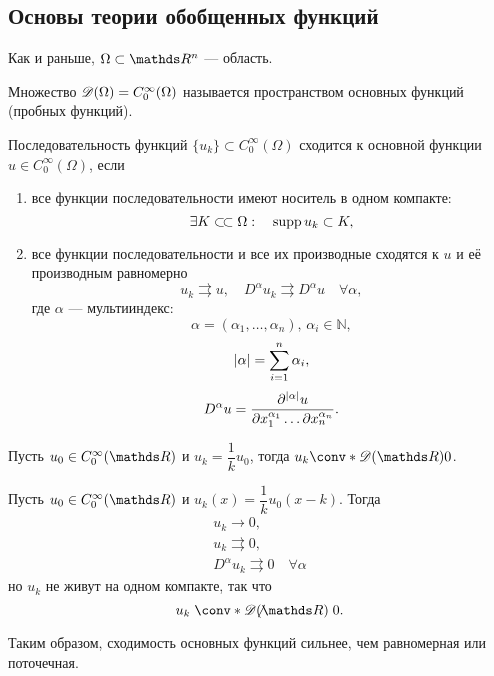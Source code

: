 
\subsection{Основы теории обобщенных функций}
Как и раньше, $\Omega \subset \real^n$ --- область.
\begin{definition}
Множество $ \mathscr{D}(\Omega) = C_0^\infty(\Omega)$ называется пространством основных функций (пробных функций).
\end{definition}
\begin{definition}
Последовательность функций $\{u_k\} \subset C_0^\infty(\Omega)$ сходится к основной функции $u \in C_0^\infty(\Omega)$, если 
\begin{enumerate}
\item все функции последовательности имеют носитель в одном компакте: $$\exists K \ssubset \Omega: \quad \supp u_k \subset K,$$
\item все функции последовательности и все их производные сходятся к $u$ и её производным равномерно $$u_k \rightrightarrows u, \quad D^\alpha u_k \rightrightarrows D^\alpha u \quad \forall \alpha,$$ где $\alpha$ --- мультииндекс: $$\alpha = (\alpha_1, \ldots, \alpha_n), \, \alpha_i \in \mathds{N},$$ $$\lvert\alpha\rvert = \sum\limits_{i=1}^{n}\alpha_i,$$
$$D^\alpha u = \dfrac{\partial^{\lvert\alpha\rvert}u}{\partial x_1^{\alpha_1}\ldots\partial x_n^{\alpha_n}}.$$
\end{enumerate}
\end{definition}

\begin{example}Пусть $u_0 \in C_0^\infty(\real)$ и $u_k = \dfrac{1}{k}u_0$, тогда $u_k \conv*{\beauD(\real)}{} 0$.
\end{example}

\begin{example}Пусть $u_0 \in C_0^\infty(\real)$ и $u_k(x) = \dfrac{1}{k}u_0(x - k)$. Тогда
\begin{gather*}
	u_k \to 0, \\
	u_k \rightrightarrows 0, \\
	D^\alpha u_k \rightrightarrows 0 \quad \forall \alpha
\end{gather*}
но $u_k$ не живут на одном компакте, так что $$ u_k \centernot {\conv*{\beauD(\real)}{}} 0.$$

Таким образом, сходимость основных функций сильнее, чем равномерная или поточечная.
\end{example}

